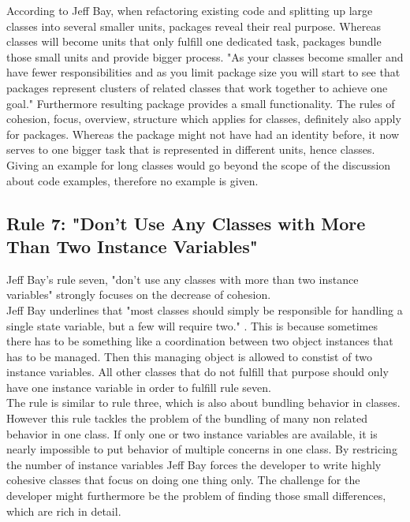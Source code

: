 According to Jeff Bay, when refactoring existing code and splitting up large classes into several smaller units, packages reveal their real purpose. Whereas classes will become units that only fulfill one dedicated task, packages bundle those small units and provide bigger process. "As your classes become smaller and have fewer responsibilities and as you limit package size you will start to see that packages represent clusters of related classes that work together to achieve one goal." \cite{oc2008} Furthermore resulting package provides a small functionality. The rules of cohesion, focus, overview, structure which applies for classes, definitely also apply for packages. Whereas the package might not have had an identity before, it now serves to one bigger task that is represented in different units, hence classes. 
\\

Giving an example for long classes would go beyond the scope of the discussion about code examples, therefore no example is given.

\subsection*{Rule 7: "Don’t Use Any Classes with More Than Two Instance Variables"}
Jeff Bay's rule seven, "don't use any classes with more than two instance variables" strongly focuses on the decrease of cohesion.
\\

Jeff Bay underlines that "most classes should simply be responsible for handling a single state variable, but a few will require two." \cite{oc2008}. This is because sometimes there has to be something like a coordination between two object instances that has to be managed. Then this managing object is allowed to constist of two instance variables. All other classes that do not fulfill that purpose should only have one instance variable in order to fulfill rule seven.
\\

The rule is similar to rule three, which is also about bundling behavior in classes. However this rule tackles the problem of the bundling of many non related behavior in one class. If only one or two instance variables are available, it is nearly impossible to put behavior of multiple concerns in one class. By restricing the number of instance variables Jeff Bay forces the developer to write highly cohesive classes that focus on doing one thing only. The challenge for the developer might furthermore be the problem of finding those small differences, which are rich in detail. 
\\

